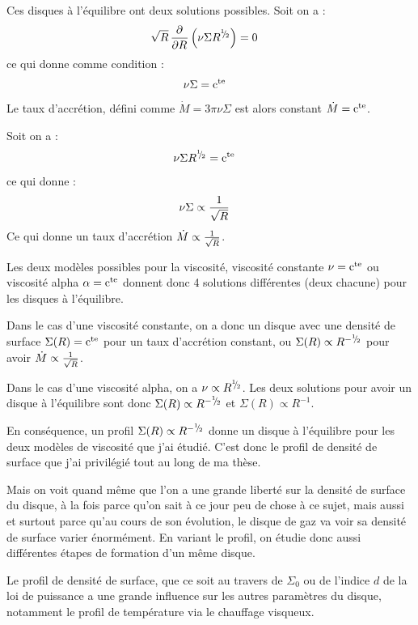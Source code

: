 Ces disques à l'équilibre ont deux solutions possibles. Soit on a :
\begin{align*}
\sqrt{R} \mathinner{ \dfrac{\partial{^{}}}{\partial{{R}^{}}} }\left(\nu \Sigma R^{{}^{1\!\!}/ _{\!2}}\right) &= 0
\end{align*}
ce qui donne comme condition :
\begin{align}
\nu \Sigma &= \mathrm{c^{te}}
\end{align}
Le taux d'accrétion, défini comme $\dot{M}=3\pi\nu\Sigma$ est alors constant $\dot{M}=\mathrm{c^{te}}$. 

Soit on a :
\begin{align*}
\nu \Sigma R^{{}^{1\!\!}/ _{\!2}} &= \mathrm{c^{te}}
\end{align*}
ce qui donne : 
\begin{align}
\nu\Sigma &\propto \frac{1}{\sqrt{R}}
\end{align}
Ce qui donne un taux d'accrétion $\dot{M}\propto\frac{1}{\sqrt{R}}$. 

Les deux modèles possibles pour la viscosité, viscosité constante $\nu=\mathrm{c^{te}}$ ou viscosité alpha $\alpha=\mathrm{c^{te}}$ donnent donc 4 solutions différentes (deux chacune) pour les disques à l'équilibre. 

Dans le cas d'une viscosité constante, on a donc un disque avec une densité de surface $\Sigma(R)=\mathrm{c^{te}}$ pour un taux d'accrétion constant, ou $\Sigma(R)\propto R^{-{{}^{1\!\!}/ _{\!2}}}$ pour avoir $\dot{M}\propto\frac{1}{\sqrt{R}}$.

Dans le cas d'une viscosité alpha, on a $\nu\propto R^{{{}^{1\!\!}/ _{\!2}}}$. Les deux solutions pour avoir un disque à l'équilibre sont donc $\Sigma(R)\propto R^{-{{}^{1\!\!}/ _{\!2}}}$ et $\Sigma(R)\propto R^{-1}$. 

En conséquence, un profil $\Sigma(R)\propto R^{-{{}^{1\!\!}/ _{\!2}}}$ donne un disque à l'équilibre pour les deux modèles de viscosité que j'ai étudié. C'est donc le profil de densité de surface que j'ai privilégié tout au long de ma thèse. 

Mais on voit quand même que l'on a une grande liberté sur la densité de surface du disque, à la fois parce qu'on sait à ce jour peu de chose à ce sujet, mais aussi et surtout parce qu'au cours de son évolution, le disque de gaz va voir sa densité de surface varier énormément. En variant le profil, on étudie donc aussi différentes étapes de formation d'un même disque. 

Le profil de densité de surface, que ce soit au travers de $\Sigma_0$ ou de l'indice $d$ de la loi de puissance a une
grande influence sur les autres paramètres du disque, notamment le profil de température via le chauffage visqueux. 

